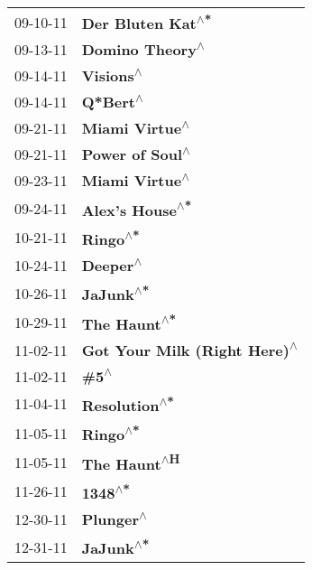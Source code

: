 \begin{supertabular}{p{0.25\columnwidth}p{0.75\columnwidth}}
 09-10-11 &             \textbf{Der Bluten Kat\textsuperscript{$\wedge$*}} \\
 09-13-11 &               \textbf{Domino Theory\textsuperscript{$\wedge$}} \\
 09-14-11 &                     \textbf{Visions\textsuperscript{$\wedge$}} \\
 09-14-11 &                      \textbf{Q*Bert\textsuperscript{$\wedge$}} \\
 09-21-11 &                \textbf{Miami Virtue\textsuperscript{$\wedge$}} \\
 09-21-11 &               \textbf{Power of Soul\textsuperscript{$\wedge$}} \\
 09-23-11 &                \textbf{Miami Virtue\textsuperscript{$\wedge$}} \\
 09-24-11 &               \textbf{Alex's House\textsuperscript{$\wedge$*}} \\
 10-21-11 &                      \textbf{Ringo\textsuperscript{$\wedge$*}} \\
 10-24-11 &                      \textbf{Deeper\textsuperscript{$\wedge$}} \\
 10-26-11 &                     \textbf{JaJunk\textsuperscript{$\wedge$*}} \\
 10-29-11 &                  \textbf{The Haunt\textsuperscript{$\wedge$*}} \\
 11-02-11 &  \textbf{Got Your Milk (Right Here)\textsuperscript{$\wedge$}} \\
 11-02-11 &                         \textbf{\#5\textsuperscript{$\wedge$}} \\
 11-04-11 &                 \textbf{Resolution\textsuperscript{$\wedge$*}} \\
 11-05-11 &                      \textbf{Ringo\textsuperscript{$\wedge$*}} \\
 11-05-11 &                  \textbf{The Haunt\textsuperscript{$\wedge$H}} \\
 11-26-11 &                       \textbf{1348\textsuperscript{$\wedge$*}} \\
 12-30-11 &                     \textbf{Plunger\textsuperscript{$\wedge$}} \\
 12-31-11 &                     \textbf{JaJunk\textsuperscript{$\wedge$*}} \\
\end{supertabular}
